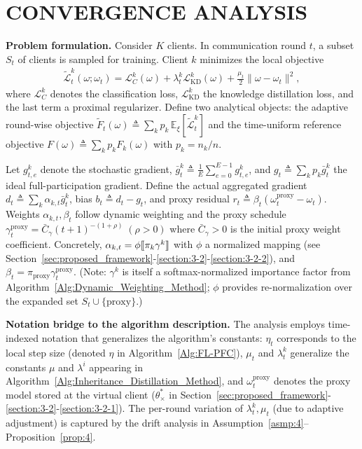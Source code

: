 \section{CONVERGENCE ANALYSIS}\label{sec:convergence-analysis}

\noindent\textbf{Problem formulation.}
Consider \(K\) clients. In communication round \(t\), a subset \(S_t\) of clients is sampled for training. Client \(k\) minimizes the local objective
\begin{align}
  \widetilde{\mathcal L}_t^k(\omega;\omega_t)
  = \mathcal L_C^k(\omega)
  + \lambda_t^k \mathcal L_{\mathrm{KD}}^k(\omega)
  + \frac{\mu_t}{2}\|\omega-\omega_t\|^2,
  \label{eq:1}
\end{align}
where \(\mathcal L_C^k\) denotes the classification loss, \(\mathcal L_{\mathrm{KD}}^k\) the knowledge distillation loss, and the last term a proximal regularizer.
Define two analytical objects: the adaptive round-wise objective \(\widetilde F_t(\omega) \triangleq \sum_k p_k\,\mathbb E_\xi[\widetilde{\mathcal L}_t^k]\) and the time-uniform reference objective \(F(\omega) \triangleq \sum_k p_k F_k(\omega)\) with \(p_k = n_k / n\).

Let \(g_{t,e}^k\) denote the stochastic gradient, \(\bar g_t^k \triangleq \frac{1}{E}\sum_{e=0}^{E-1}g_{t,e}^k\), and \(g_t \triangleq \sum_k p_k \bar g_t^k\) the ideal full-participation gradient.
Define the actual aggregated gradient \(d_t \triangleq \sum_k \alpha_{k,t}\bar g_t^k\), bias \(b_t \triangleq d_t - g_t\), and proxy residual \(r_t \triangleq \beta_t(\omega_t^{\mathrm{proxy}} - \omega_t)\).
Weights \(\alpha_{k,t}, \beta_t\) follow dynamic weighting and the proxy schedule \(\gamma_t^{\mathrm{proxy}} = \bar C_\gamma (t+1)^{-(1+\rho)}\;(\rho > 0)\) where \(\bar C_\gamma > 0\) is the initial proxy weight coefficient.
Concretely, \(\alpha_{k,t} = \phi[\kern-0.15em[ \pi_k \gamma^k ]\kern-0.15em]\) with \(\phi\) a normalized mapping (see Section~\ref{sec:proposed_framework}-\ref{section:3-2}-\ref{section:3-2-2}), and \(\beta_t = \pi_{\mathrm{proxy}}\gamma_t^{\mathrm{proxy}}\).
(Note: \(\gamma^k\) is itself a softmax-normalized importance factor from Algorithm~\ref{Alg:Dynamic_Weighting_Method}; \(\phi\) provides re-normalization over the expanded set \(S_t \cup \{\mathrm{proxy}\}\).)

\noindent\textbf{Notation bridge to the algorithm description.}
The analysis employs time-indexed notation that generalizes the algorithm's constants:
\(\eta_t\) corresponds to the local step size (denoted \(\eta\) in Algorithm~\ref{Alg:FL-PFC}),
\(\mu_t\) and \(\lambda_t^k\) generalize the constants \(\mu\) and \(\lambda^i\) appearing in Algorithm~\ref{Alg:Inheritance_Distillation_Method},
and \(\omega_t^{\mathrm{proxy}}\) denotes the proxy model stored at the virtual client (\(\theta_\times^*\) in Section~\ref{sec:proposed_framework}-\ref{section:3-2}-\ref{section:3-2-1}).
The per-round variation of \(\lambda_t^k,\mu_t\) (due to adaptive adjustment) is captured by the drift analysis in Assumption~\ref{asmp:4}--Proposition~\ref{prop:4}.

